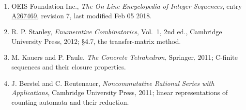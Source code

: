 \documentclass[11pt]{article}
\theoremstyle{definition}
\begin{document}
\begin{enumerate}

\item OEIS Foundation Inc., \emph{The On-Line Encyclopedia of Integer Sequences}, entry \href{https://oeis.org/A267469}{A267469}, revision 7, last modified Feb 05 2018.

\item R. P. Stanley, \emph{Enumerative Combinatorics}, Vol.~1, 2nd ed., Cambridge University Press, 2012; \S4.7, the transfer-matrix method.

\item M. Kauers and P. Paule, \emph{The Concrete Tetrahedron}, Springer, 2011; C-finite sequences and their closure properties.

\item J. Berstel and C. Reutenauer, \emph{Noncommutative Rational Series with Applications}, Cambridge University Press, 2011; linear representations of counting automata and their reduction.

\end{enumerate}
\end{document}
